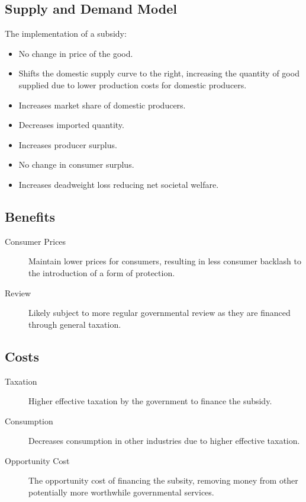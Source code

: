 \documentclass[a4paper,11pt]{report}
\begin{document}
\subsection{Supply and Demand Model}

The implementation of a subsidy:

\begin{itemize}
\item No change in price of the good.
\item Shifts the domestic supply curve to the right, increasing the quantity of
	good supplied due to lower production costs for domestic producers.
\item Increases market share of domestic producers.
\item Decreases imported quantity.
\item Increases producer surplus.
\item No change in consumer surplus.
\item Increases deadweight loss reducing net societal welfare.
\end{itemize}

\subsection{Benefits}

\begin{description}
\item [Consumer Prices] Maintain lower prices for consumers, resulting in less
	consumer backlash to the introduction of a form of protection.
\item [Review] Likely subject to more regular governmental review as they are
	financed through general taxation.
\end{description}

\subsection{Costs}

\begin{description}
\item [Taxation] Higher effective taxation by the government to finance the
	subsidy.
\item [Consumption] Decreases consumption in other industries due to higher
	effective taxation.
\item [Opportunity Cost] The opportunity cost of financing the subsity,
	removing money from other potentially more worthwhile governmental services.
\end{description}
\end{document}
